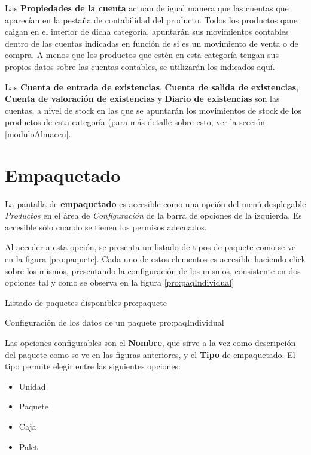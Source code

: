 Las \textbf{Propiedades de la cuenta} actuan de igual manera que las cuentas que aparecían en la pestaña de contabilidad del producto. Todos los productos qaue caigan en el interior de dicha categoría, apuntarán sus movimientos contables dentro de las cuentas indicadas en función de si es un movimiento de venta o de compra. A menos que los productos que estén en esta categoría tengan sus propios datos sobre las cuentas contables, se utilizarán los indicados aquí.

Las \textbf{Cuenta de entrada de existencias}, \textbf{Cuenta de salida de existencias}, \textbf{Cuenta de valoración de existencias} y \textbf{Diario de existencias} son las cuentas, a nivel de stock en las que se apuntarán los movimientos de stock de los productos de esta categoría (para más detalle sobre esto, ver la sección \ref{moduloAlmacen}.





\section{Empaquetado}
\label{pro:empaquetado}

La pantalla de \textbf{empaquetado} es accesible como una opción del menú desplegable \emph{Productos} en el área de \emph{Configuración} de la barra de opciones de la izquierda. Es accesible sólo cuando se tienen los permisos adecuados.

Al acceder a esta opción, se presenta un listado de tipos de paquete como se ve en la figura \ref{pro:paquete}. Cada uno de estos elementos es accesible haciendo click sobre los mismos, presentando la configuración de los mismos, consistente en dos opciones tal y como se observa en la figura \ref{pro:paqIndividual}

{Listado de paquetes disponibles}
{pro:paquete}

{Configuración de los datos de un paquete}
{pro:paqIndividual}

Las opciones configurables son el \textbf{Nombre}, que sirve a la vez como descripción del paquete como se ve en las figuras anteriores, y el \textbf{Tipo} de empaquetado. El tipo permite elegir entre las siguientes opciones:

\begin{itemize}
\item Unidad
\item Paquete
\item Caja
\item Palet
\end{itemize}

